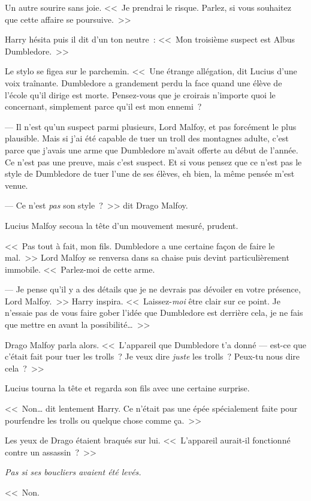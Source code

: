 Un autre sourire sans joie. <<~Je prendrai le risque. Parlez, si vous souhaitez que cette affaire se poursuive.~>>

Harry hésita puis il dit d'un ton neutre~: <<~Mon troisième suspect est Albus Dumbledore.~>>

Le stylo se figea sur le parchemin. <<~Une étrange allégation, dit Lucius d'une voix traînante. Dumbledore a grandement perdu la face quand une élève de l'école qu'il dirige est morte. Pensez-vous que je croirais n'importe quoi le concernant, simplement parce qu'il est mon ennemi~?

--- Il n'est qu'un suspect parmi plusieurs, Lord Malfoy, et pas forcément le plus plausible. Mais si j'ai été capable de tuer un troll des montagnes adulte, c'est parce que j'avais une arme que Dumbledore m'avait offerte au début de l'année. Ce n'est pas une preuve, mais c'est suspect. Et si vous pensez que ce n'est pas le style de Dumbledore de tuer l'une de ses élèves, eh bien, la même pensée m'est venue.

--- Ce n'est \emph{pas} son style~?~>> dit Drago Malfoy.

Lucius Malfoy secoua la tête d'un mouvement mesuré, prudent.

<<~Pas tout à fait, mon fils. Dumbledore a une certaine façon de faire le mal.~>> Lord Malfoy se renversa dans sa chaise puis devint particulièrement immobile. <<~Parlez-moi de cette arme.

--- Je pense qu'il y a des détails que je ne devrais pas dévoiler en votre présence, Lord Malfoy.~>> Harry inspira. <<~Laissez-\emph{moi} être clair sur ce point. Je n'essaie pas de vous faire gober l'idée que Dumbledore est derrière cela, je ne fais que mettre en avant la possibilité…~>>

Drago Malfoy parla alors. <<~L'appareil que Dumbledore t'a donné — est-ce que c'était fait pour tuer les trolls~? Je veux dire \emph{juste} les trolls~? Peux-tu nous dire cela~?~>>

Lucius tourna la tête et regarda son fils avec une certaine surprise.

<<~Non… dit lentement Harry. Ce n'était pas une épée spécialement faite pour pourfendre les trolls ou quelque chose comme ça.~>>

Les yeux de Drago étaient braqués sur lui. <<~L'appareil aurait-il fonctionné contre un assassin~?~>>

\emph{Pas si ses boucliers avaient été levés.}

<<~Non.


